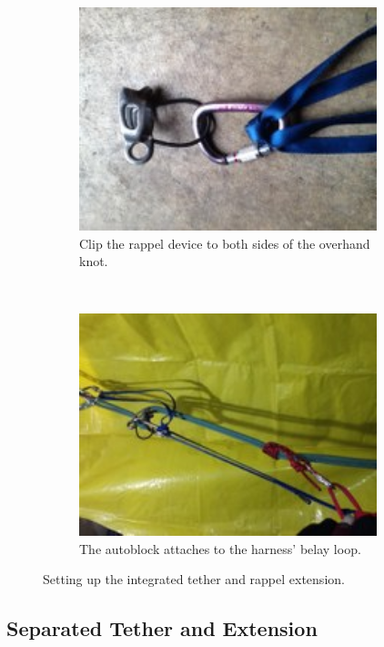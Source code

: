\documentclass[nonacm,acmtog]{acmart}
\begin{document}
\begin{figure}
\begin{subfigure}[t]{0.23\textwidth}
         \centering
         \includegraphics[width=0.95\textwidth]{images/int-step3.jpg}
         \caption{Clip the rappel device to both sides of the overhand knot.}
         \label{fig:int-step3}
      \end{subfigure}
      ~
      \begin{subfigure}[t]{0.23\textwidth}
         \centering
         \includegraphics[width=0.95\textwidth]{images/int-step4.jpg}
         \caption{The autoblock attaches to the harness' belay loop.}
         \label{fig:int-step4}
      \end{subfigure}
      \caption{Setting up the integrated tether and rappel extension.}
   \end{figure}

\subsection{Separated Tether and Extension}
\end{document}
